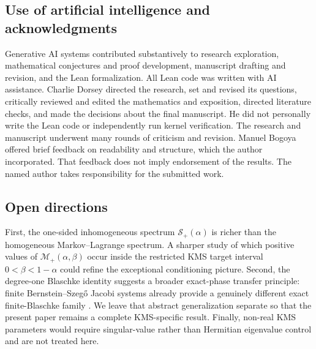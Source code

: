 \documentclass[11pt,reqno]{amsart}
\theoremstyle{plain}
\theoremstyle{definition}
\begin{document}
\begin{samepage}
\subsection*{Use of artificial intelligence and acknowledgments}
Generative AI systems contributed substantively to research exploration, mathematical
conjectures and proof development, manuscript drafting and revision, and the Lean
formalization. All Lean code was written with AI assistance. Charlie Dorsey directed
the research, set and revised its questions, critically reviewed and edited the
mathematics and exposition, directed literature checks, and made the decisions about
the final manuscript. He did not personally write the Lean code or independently
run kernel verification. The research and manuscript underwent many rounds of
criticism and revision. Manuel Bogoya offered brief feedback on readability and
structure, which the author incorporated. That feedback does not imply endorsement
of the results. The named author takes responsibility for the submitted work.

\end{samepage}

\subsection*{Open directions}
First, the one-sided inhomogeneous spectrum $\mathcal S_+(\alpha)$ is richer than
the homogeneous Markov--Lagrange spectrum.  A sharper study of which positive
values of $\mathcal M_+(\alpha,\beta)$ occur inside the restricted KMS target
interval $0<\beta<1-\alpha$ could refine the exceptional conditioning picture.
Second, the degree-one Blaschke identity suggests a broader exact-phase transfer
principle: finite Bernstein--Szeg\H{o} Jacobi systems already provide a genuinely
different exact finite-Blaschke family \cite{vanDiejenEmsiz2018}.  We leave that
abstract generalization separate so that the present paper remains a complete
KMS-specific result.  Finally, non-real KMS parameters would require singular-value
rather than Hermitian eigenvalue control and are not treated here.
\end{document}
